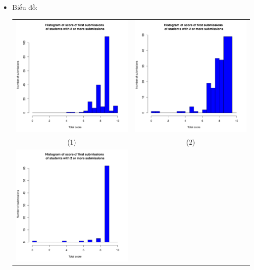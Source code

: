 \documentclass[a4paper]{article}
\theoremstyle{definition}
\begin{document}
\begin{enumerate}[a)]
\begin{itemize}
        \item Biểu đồ:\\
        \begin{center}
            \begin{tabular}{c c}
                 \includegraphics[width = 6.9cm]{Images/img12-6-1.png} & \includegraphics[width = 6.9cm]{Images/img12-6-2.png} \\
                 (1) & (2) \\
                 \includegraphics[width = 6.9cm]{Images/img12-6-3.png} &

\end{tabular}
\end{center}
\end{itemize}
\end{enumerate}
\end{document}
